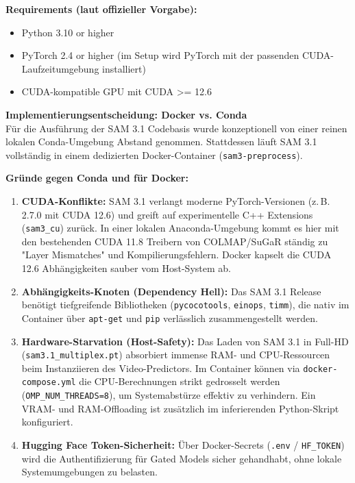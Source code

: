\documentclass[12pt,a4paper]{article}
\begin{document}
\textbf{Requirements (laut offizieller Vorgabe):}
\begin{itemize}[noitemsep]
    \item Python 3.10 or higher
    \item PyTorch 2.4 or higher (im Setup wird PyTorch mit der passenden CUDA-Laufzeitumgebung installiert)
    \item CUDA-kompatible GPU mit CUDA >= 12.6
\end{itemize}

\textbf{Implementierungsentscheidung: Docker vs. Conda}\\
Für die Ausführung der SAM 3.1 Codebasis wurde konzeptionell von einer reinen lokalen Conda-Umgebung Abstand genommen. Stattdessen läuft SAM 3.1 vollständig in einem dedizierten Docker-Container (\texttt{sam3-preprocess}).

\textbf{Gründe gegen Conda und für Docker:}
\begin{enumerate}[noitemsep]
    \item \textbf{CUDA-Konflikte:} SAM 3.1 verlangt moderne PyTorch-Versionen (z.\,B. 2.7.0 mit CUDA 12.6) und greift auf experimentelle C++ Extensions (\texttt{sam3\_cu}) zurück. In einer lokalen Anaconda-Umgebung kommt es hier mit den bestehenden CUDA 11.8 Treibern von COLMAP/SuGaR ständig zu "Layer Mismatches" und Kompilierungsfehlern. Docker kapselt die CUDA 12.6 Abhängigkeiten sauber vom Host-System ab.
    \item \textbf{Abhängigkeits-Knoten (Dependency Hell):} Das SAM 3.1 Release benötigt tiefgreifende Bibliotheken (\texttt{pycocotools}, \texttt{einops}, \texttt{timm}), die nativ im Container über \texttt{apt-get} und \texttt{pip} verlässlich zusammengestellt werden.
    \item \textbf{Hardware-Starvation (Host-Safety):} Das Laden von SAM 3.1 in Full-HD (\texttt{sam3.1\_multiplex.pt}) absorbiert immense RAM- und CPU-Ressourcen beim Instanziieren des Video-Predictors. Im Container können via \texttt{docker-compose.yml} die CPU-Berechnungen strikt gedrosselt werden (\texttt{OMP\_NUM\_THREADS=8}), um Systemabstürze effektiv zu verhindern. Ein VRAM- und RAM-Offloading ist zusätzlich im inferierenden Python-Skript konfiguriert.
    \item \textbf{Hugging Face Token-Sicherheit:} Über Docker-Secrets (\texttt{.env} / \texttt{HF\_TOKEN}) wird die Authentifizierung für Gated Models sicher gehandhabt, ohne lokale Systemumgebungen zu belasten.
\end{enumerate}
\end{document}
